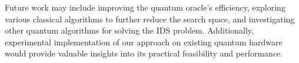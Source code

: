 Future work may include improving the quantum oracle's efficiency, exploring various classical algorithms to further reduce the search space, and investigating other quantum algorithms for solving the IDS problem. Additionally, experimental implementation of our approach on existing quantum hardware would provide valuable insights into its practical feasibility and performance.

